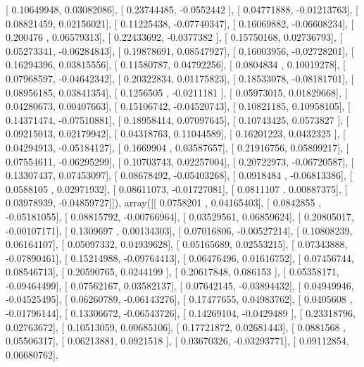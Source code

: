 \documentclass{article}
\begin{document}
       [ 0.10649948,  0.03082086],
       [ 0.23744485, -0.0552442 ],
       [ 0.04771888, -0.01213763],
       [ 0.08821459,  0.02156021],
       [ 0.11225438, -0.07740347],
       [ 0.16069882, -0.06608234],
       [ 0.200476  ,  0.06579313],
       [ 0.22433692, -0.0377382 ],
       [ 0.15750168,  0.02736793],
       [ 0.05273341, -0.06284843],
       [ 0.19878691,  0.08547927],
       [ 0.16003956, -0.02728201],
       [ 0.16294396,  0.03815556],
       [ 0.11580787,  0.04792256],
       [ 0.0804834 ,  0.10019278],
       [ 0.07968597, -0.04642342],
       [ 0.20322834,  0.01175823],
       [ 0.18533078, -0.08181701],
       [ 0.08956185,  0.03841354],
       [ 0.1256505 , -0.0211181 ],
       [ 0.05973015,  0.01829668],
       [ 0.04280673,  0.00407663],
       [ 0.15106742, -0.04520743],
       [ 0.10821185,  0.10958105],
       [ 0.14371474, -0.07510881],
       [ 0.18958414,  0.07097645],
       [ 0.10743425,  0.0573827 ],
       [ 0.09215013,  0.02179942],
       [ 0.04318763,  0.11044589],
       [ 0.16201223,  0.0432325 ],
       [ 0.04294913, -0.05184127],
       [ 0.1669904 ,  0.03587657],
       [ 0.21916756,  0.05899217],
       [ 0.07554611, -0.06295299],
       [ 0.10703743,  0.02257004],
       [ 0.20722973, -0.06720587],
       [ 0.13307437,  0.07453097],
       [ 0.08678492, -0.05403268],
       [ 0.0918484 , -0.06813386],
       [ 0.0588105 ,  0.02971932],
       [ 0.08611073, -0.01727081],
       [ 0.0811107 ,  0.00887375],
       [ 0.03978939, -0.04859727]]), array([[ 0.0758201 ,  0.04165403],
       [ 0.0842855 , -0.05181055],
       [ 0.08815792, -0.00766964],
       [ 0.03529561,  0.06859624],
       [ 0.20805017, -0.00107171],
       [ 0.1309697 ,  0.00134303],
       [ 0.07016806, -0.00527214],
       [ 0.10808239,  0.06164107],
       [ 0.05097332,  0.04939628],
       [ 0.05165689,  0.02553215],
       [ 0.07343888, -0.07890461],
       [ 0.15214988, -0.09764413],
       [ 0.06476496,  0.01616752],
       [ 0.07456744,  0.08546713],
       [ 0.20590765,  0.0244199 ],
       [ 0.20617848,  0.086153  ],
       [ 0.05358171, -0.09464499],
       [ 0.07562167,  0.03582137],
       [ 0.07642145, -0.03894432],
       [ 0.04949946, -0.04525495],
       [ 0.06260789, -0.06143276],
       [ 0.17477655,  0.04983762],
       [ 0.0405608 , -0.01796144],
       [ 0.13306672, -0.06543726],
       [ 0.14269104, -0.0429489 ],
       [ 0.23318796,  0.02763672],
       [ 0.10513059,  0.00685106],
       [ 0.17721872,  0.02681443],
       [ 0.0881568 ,  0.05506317],
       [ 0.06213881,  0.0921518 ],
       [ 0.03670326, -0.03293771],
       [ 0.09112854,  0.06680762],
\end{document}
